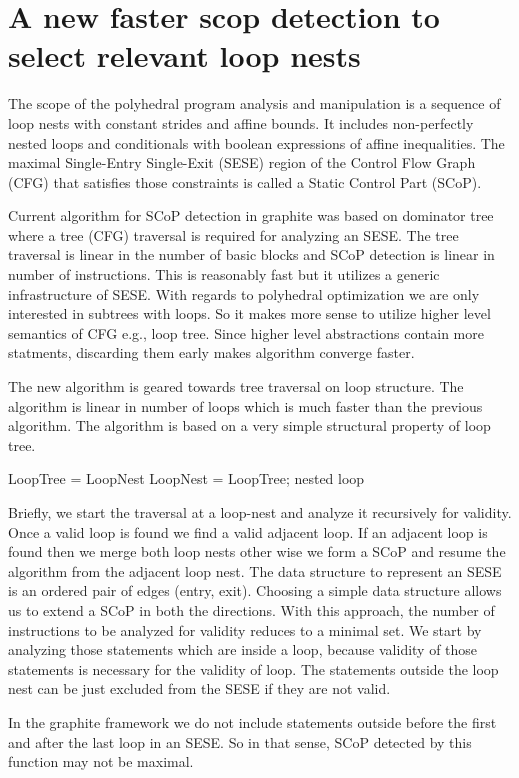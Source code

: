 \documentclass{sigplanconf}
\begin{document}
\section{A new faster scop detection to select relevant loop nests}
The scope of the polyhedral program analysis and manipulation is a sequence of loop
nests with constant strides and affine bounds. It includes non-perfectly nested loops
and conditionals with boolean expressions of affine inequalities.
The maximal Single-Entry Single-Exit (SESE) region of the Control Flow Graph
(CFG) that satisfies those constraints is called a Static Control Part (SCoP). \cite{Girbal, Bondhugula, trifunovic}

Current algorithm for SCoP detection in graphite was based on dominator tree where a tree (CFG) traversal is required
for analyzing an SESE. The tree traversal is linear in the number of basic blocks and SCoP detection is linear in
number of instructions. This is reasonably fast but it utilizes a generic infrastructure of SESE. With regards to
polyhedral optimization we are only interested in subtrees with loops. So it makes more sense to utilize higher level
semantics of CFG e.g., loop tree. Since higher level abstractions contain more statments, discarding them early
makes algorithm converge faster.

The new algorithm is geared towards tree traversal on loop structure. The algorithm is linear in number of loops
which is much faster than the previous algorithm. The algorithm is based on a very simple structural property of loop
tree.

LoopTree = LoopNest
LoopNest = LoopTree; nested loop

Briefly, we start the traversal at a loop-nest and analyze it recursively for validity. Once a valid loop is
found we find a valid adjacent loop. If an adjacent loop is found then we merge both loop nests
other wise we form a SCoP and resume the algorithm from the adjacent loop nest. The data structure to represent an SESE
is an ordered pair of edges (entry, exit). Choosing a simple data structure allows us to extend a SCoP in both the
directions. With this approach, the number of instructions to be analyzed for validity reduces to a minimal set.
We start by analyzing those statements which are inside a loop, because validity of those statements is
necessary for the validity of loop. The statements outside the loop nest can be just excluded from the
SESE if they are not valid.

In the graphite framework we do not include statements outside before the first and after the last loop in an SESE.
So in that sense, SCoP detected by this function may not be maximal.
\end{document}
